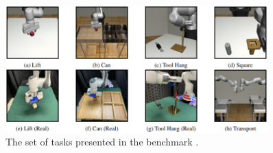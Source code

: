 \begin{figure}[t]
    \centering
    \includegraphics[width=0.9\textwidth]{figures/images/what_matters/task.png}
    \caption{The set of tasks presented in the benchmark \cite{mandlekar2022matters}.}
    \label{fig:what_matters_task}
\end{figure}
